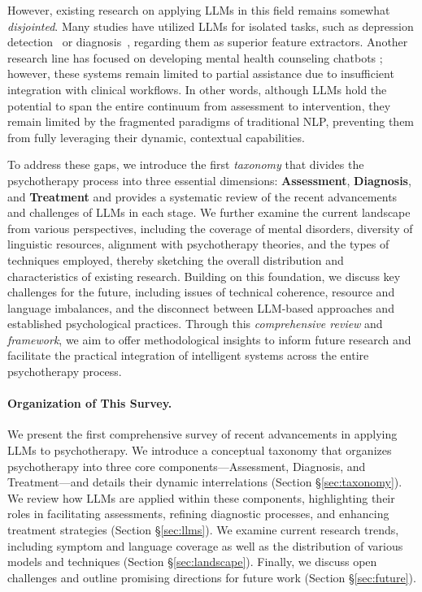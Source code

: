 

However, existing research on applying LLMs in this field remains somewhat \textit{disjointed}. Many studies have utilized LLMs for isolated tasks, such as depression detection~\cite{18,27} or diagnosis~\cite{107}, regarding them as superior feature extractors. Another research line has focused on developing mental health counseling chatbots \cite{chen-etal-2023-soulchat,19}; however, these systems remain limited to partial assistance due to insufficient integration with clinical workflows. In other words, although LLMs hold the potential to span the entire continuum from assessment to intervention, they remain limited by the fragmented paradigms of traditional NLP, preventing them from fully leveraging their dynamic, contextual capabilities.

To address these gaps, we introduce the first \textit{taxonomy} that divides the psychotherapy process into three essential dimensions: \textbf{Assessment}, \textbf{Diagnosis}, and \textbf{Treatment} and provides a systematic review of the recent advancements and challenges of LLMs in each stage. We further examine the current landscape from various perspectives, including the coverage of mental disorders, diversity of linguistic resources, alignment with psychotherapy theories, and the types of techniques employed, thereby sketching the overall distribution and characteristics of existing research. Building on this foundation, we discuss key challenges for the future, including issues of technical coherence, resource and language imbalances, and the disconnect between LLM-based approaches and established psychological practices. Through this \textit{comprehensive review} and \textit{framework}, we aim to offer methodological insights to inform future research and facilitate the practical integration of intelligent systems across the entire psychotherapy process.


\paragraph{Organization of This Survey.} We present the first comprehensive survey of recent advancements in applying LLMs to psychotherapy. We introduce a conceptual taxonomy that organizes psychotherapy into three core components—Assessment, Diagnosis, and Treatment—and details their dynamic interrelations (Section \S\ref{sec:taxonomy}). We review how LLMs are applied within these components, highlighting their roles in facilitating assessments, refining diagnostic processes, and enhancing treatment strategies (Section \S\ref{sec:llms}). We examine current research trends, including symptom and language coverage as well as the distribution of various models and techniques (Section \S\ref{sec:landscape}). Finally, we discuss open challenges and outline promising directions for future work (Section \S\ref{sec:future}).

